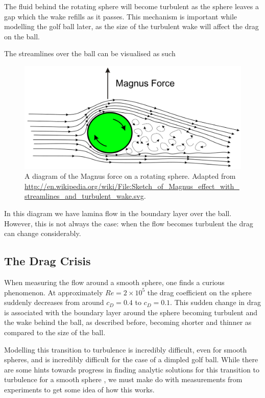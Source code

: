 The fluid behind the rotating sphere will become turbulent as the sphere leaves a gap which the wake
refills as it passes. This mechanism is important while modelling the golf ball later, as the size
of the turbulent wake will affect the drag on the ball.

The streamlines over the ball can be visualised as such
\begin{figure}[h]
\centering
\includegraphics[scale=0.45]{../images/magnus.pdf}
\caption[A diagram of the Magnus effect]{A diagram of the Magnus force on a rotating sphere.
Adapted from \url{http://en.wikipedia.org/wiki/File:Sketch_of_Magnus_effect_with_streamlines_and_turbulent_wake.svg}.}
\end{figure}

In this diagram we have lamina flow in the boundary layer over the ball. However, this is not always
the case: when the flow becomes turbulent the drag can change considerably.

\subsection{The Drag Crisis}

When measuring the flow around a smooth sphere, one finds a curious phenomenon. At approximately
$Re = 2\times10^5$ the drag coefficient on the sphere suddenly decreases from around $c_D = 0.4$ 
to $c_D = 0.1$. This sudden change in drag is associated with the boundary layer around the sphere
becoming turbulent and the wake behind the ball, as described before, becoming shorter and thinner as
compared to the size of the ball.

Modelling this transition to turbulence is incredibly difficult, even for smooth spheres, and is 
incredibly difficult for the case of a dimpled golf ball. While there are some hints towards progress 
in finding analytic solutions for this transition to turbulence for a smooth sphere 
\citet{Assis2010Analytical},
we must make do with measurements from experiments to get some idea of how this works.

